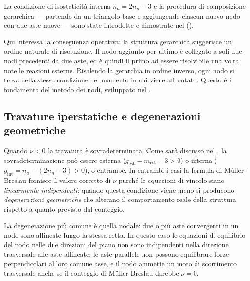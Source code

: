 La condizione di isostaticità interna $n_a = 2n_n - 3$
e la procedura di composizione gerarchica --- partendo
da un triangolo base e aggiungendo ciascun nuovo nodo
con due aste nuove --- sono state introdotte e
dimostrate nel 
().

Qui interessa la conseguenza operativa: la struttura
gerarchica suggerisce un ordine naturale di risoluzione.
Il nodo aggiunto per ultimo è collegato a soli due
nodi precedenti da due aste, ed è quindi il primo
ad essere risolvibile una volta note le reazioni
esterne. Risalendo la gerarchia in ordine inverso,
ogni nodo si trova nella stessa condizione nel
momento in cui viene affrontato. Questo è il
fondamento del metodo dei nodi, sviluppato nel
.


\subsection{Travature iperstatiche e degenerazioni
	geometriche}
\label{subsec:reticolari_iperstatiche}

Quando $\nu < 0$ la travatura è sovradeterminata.
Come sarà discusso nel ,
la sovradeterminazione può essere esterna
($g_\text{est} = m_\text{est} - 3 > 0$) o interna
($g_\text{int} = n_a - (2n_n - 3) > 0$), o entrambe.
In entrambi i casi la formula di M\"{u}ller-Breslau
fornisce il valore corretto di $\nu$ purché le
equazioni di vincolo siano \emph{linearmente
	indipendenti}: quando questa condizione viene meno
si producono \emph{degenerazioni geometriche} che
alterano il comportamento reale della struttura
rispetto a quanto previsto dal conteggio.

La degenerazione più comune è quella nodale: due
o più aste convergenti in un nodo sono allineate
lungo la stessa retta. In questo caso le equazioni
di equilibrio del nodo nelle due direzioni del piano
non sono indipendenti nella direzione trasversale
alle aste allineate: le aste parallele non possono
equilibrare forze perpendicolari al loro comune
asse, e il nodo ammette un moto di scorrimento
trasversale anche se il conteggio di M\"{u}ller-Breslau
darebbe $\nu = 0$.


